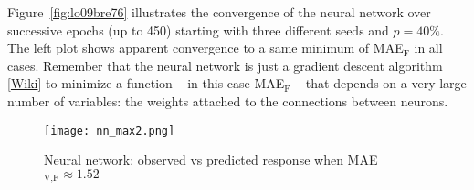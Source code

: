 \documentclass[oneside,10pt]{book}
\begin{document}
Figure~\ref{fig:lo09bre76} illustrates the convergence of the neural network over successive epochs (up to 450) starting with three different seeds and $p=40\%$.
The left plot shows apparent convergence to a same minimum of MAE$_{\text{F}}$  in all cases. Remember that the neural network is just a
\textcolor{index}{gradient descent} algorithm [\href{https://en.wikipedia.org/wiki/Gradient_descent}{Wiki}] to minimize a function -- in this case MAE$_{\text{F}}$ -- that depends on a very large number of variables: the weights attached to the connections between neurons.



\begin{figure}[H]
\centering
\texttt{[image: nn\_max2.png]}
\caption{Neural network: observed vs predicted response when MAE$_{\text{V,F}}\approx 1.52$}
\label{fig:pry998rw76}
\end{figure}
\end{document}
